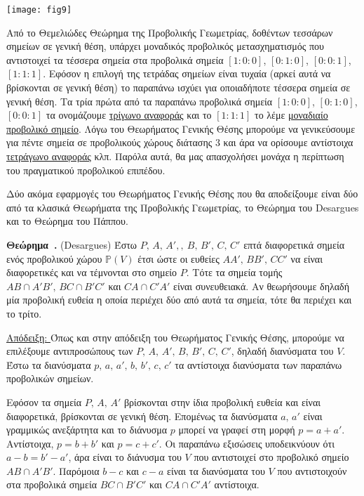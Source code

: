 \documentclass[12pt, a4paper]{book}
\newcounter{theorem}[section]
\newenvironment{theorem}[1][]{\refstepcounter{theorem}\par\medskip
   \textbf{Θεώρημα~\thetheorem. #1} \rmfamily}{\medskip}
\begin{document}
\begin{center}
\texttt{[image: fig9]}
\end{center}

Από το Θεμελιώδες Θεώρημα της Προβολικής Γεωμετρίας, δοθέντων τεσσάρων σημείων σε γενική θέση, υπάρχει μοναδικός προβολικός μετασχηματισμός που αντιστοιχεί τα τέσσερα σημεία στα προβολικά σημεία $[1:0:0]$, $[0:1:0]$, $[0:0:1]$, $[1:1:1]$. Εφόσον η επιλογή της τετράδας σημείων είναι τυχαία (αρκεί αυτά να βρίσκονται σε γενική θέση) το παραπάνω ισχύει για οποιαδήποτε τέσσερα σημεία σε γενική θέση. Τα τρία πρώτα από τα παραπάνω προβολικά σημεία $[1:0:0]$, $[0:1:0]$, $[0:0:1]$ τα ονομάζουμε \underline{τρίγωνο αναφοράς} και το $[1:1:1]$ το λέμε \underline{μοναδιαίο προβολικό σημείο}. Λόγω του Θεωρήματος Γενικής Θέσης μπορούμε να γενικεύσουμε για πέντε σημεία σε προβολικούς χώρους διάτασης $3$ και άρα να ορίσουμε αντίστοιχα \underline{τετράγωνο αναφοράς} κλπ. Παρόλα αυτά, θα μας απασχολήσει μονάχα η περίπτωση του πραγματικού προβολικού επιπέδου.
  
Δύο ακόμα εφαρμογές του Θεωρήματος Γενικής Θέσης που θα αποδείξουμε είναι δύο από τα κλασικά Θεωρήματα της Προβολικής Γεωμετρίας, το Θεώρημα του \textlatin{Desargues} και το Θεώρημα του Πάππου.
  

\begin{theorem} (\foreignlanguage{english}{Desargues})
Έστω $P,\, A,\, A',,\ B,\, B',\, C,\, C'$ επτά διαφορετικά σημεία ενός προβολικού χώρου $\mathbb{P}(V)$ έτσι ώστε οι ευθείες $AA',\, BB',\, CC'$ να είναι διαφορετικές και να τέμνονται στο σημείο $P$. Τότε τα σημεία τομής $AB \cap A'B',\, BC \cap B'C'$ και $CA \cap C'A'$ είναι συνευθειακά. Αν θεωρήσουμε δηλαδή μία προβολική ευθεία η οποία περιέχει δύο από αυτά τα σημεία, τότε θα περιέχει και το τρίτο.
\end{theorem}

\underline{Απόδειξη: } Όπως και στην απόδειξη του Θεωρήματος Γενικής Θέσης, μπορούμε να επιλέξουμε αντιπροσώπους των $P,\, A,\, A',\, B,\, B',\, C,\, C'$, δηλαδή διανύσματα του $V$. Έστω  τα διανύσματα $p,\, a,\, a',\, b,\, b',\, c,\, c'$ τα αντίστοιχα διανύσματα των παραπάνω προβολικών σημείων.

Εφόσον τα σημεία $P,\, A,\, A'$ βρίσκονται στην ίδια προβολική ευθεία και είναι διαφορετικά, βρίσκονται σε γενική θέση. Επομένως τα διανύσματα $a,\, a'$ είναι γραμμικώς ανεξάρτητα και το διάνυσμα $p$ μπορεί να γραφεί στη μορφή $p = a +a'$. Αντίστοιχα, $p = b + b'$ και $p = c + c'$. Οι παραπάνω εξισώσεις υποδεικνύουν ότι $a-b = b'-a'$, άρα είναι το διάνυσμα του $V$ που αντιστοιχεί στο προβολικό σημείο  $AB \cap A'B'$. Παρόμοια $b-c$ και $c-a$ είναι τα διανύσματα του $V$ που αντιστοιχούν στα προβολικά σημεία $BC \cap B'C'$ και $CA \cap C'A'$ αντίστοιχα.
\end{document}
